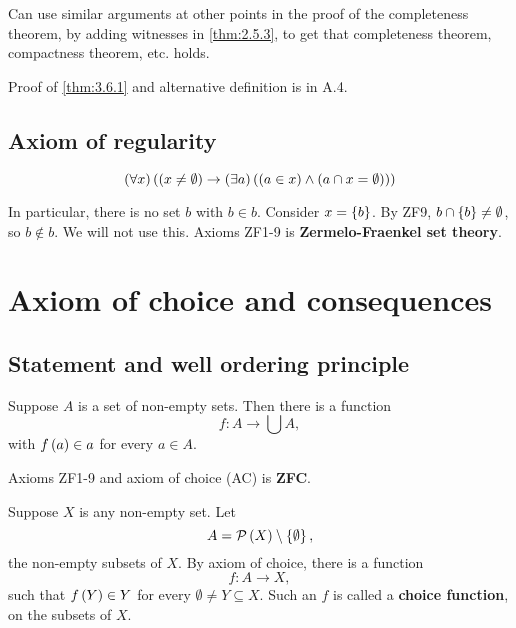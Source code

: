 
\begin{remark}
Can use similar arguments at other points in the proof of the completeness theorem, by adding witnesses in \ref{thm:2.5.3}, to get that completeness theorem, compactness theorem, etc. holds.
\end{remark}

Proof of \ref{thm:3.6.1} and alternative definition is in A.4.

\subsection{Axiom of regularity}

\begin{axiom}
$$ \left( \forall x \right)\left( \left( x \ne \emptyset \right) \rightarrow \left( \exists a \right)\left( \left( a \in x \right) \land \left( a \cap x = \emptyset \right) \right) \right) $$
\end{axiom}

In particular, there is no set $ b $ with $ b \in b $. Consider $ x = \left\{ b \right\} $. By ZF9, $ b \cap \left\{ b \right\} \ne \emptyset $, so $ b \notin b $. We will not use this. Axioms ZF1-9 is \textbf{Zermelo-Fraenkel set theory}.

\pagebreak

\section{Axiom of choice and consequences}

\subsection{Statement and well ordering principle}

\begin{definition}
Suppose $ A $ is a set of non-empty sets. Then there is a function
$$ f : A \to \bigcup A, $$
with $ f\left( a \right) \in a $ for every $ a \in A $.
\end{definition}

Axioms ZF1-9 and axiom of choice (AC) is \textbf{ZFC}.

\begin{example}
Suppose $ X $ is any non-empty set. Let
$$ A = \mathcal{P}\left( X \right) \setminus \left\{ \emptyset \right\}, $$
the non-empty subsets of $ X $. By axiom of choice, there is a function
$$ f : A \to X, $$
such that $ f\left( Y \right) \in Y $ for every $ \emptyset \ne Y \subseteq X $. Such an $ f $ is called a \textbf{choice function}, on the subsets of $ X $.
\end{example}

